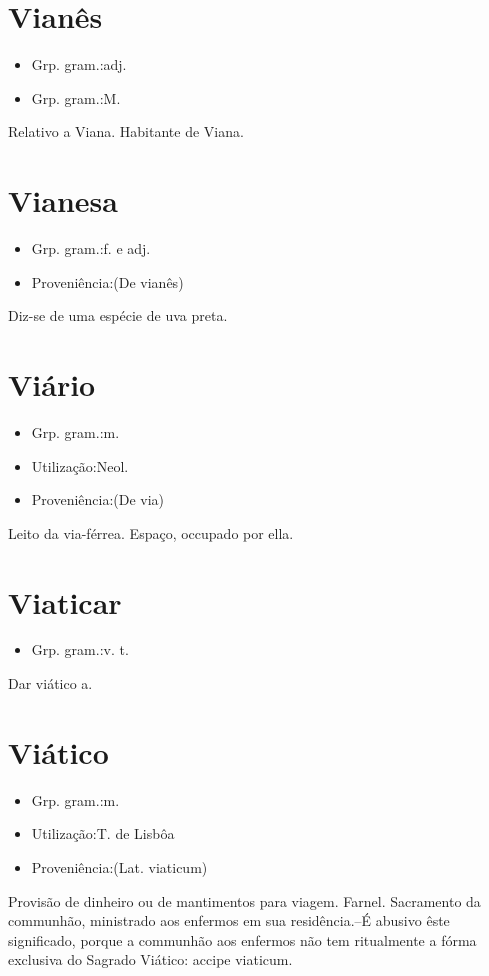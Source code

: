 \documentclass{article}
\begin{document}
\section{Vianês}
\begin{itemize}
\item {Grp. gram.:adj.}
\end{itemize}
\begin{itemize}
\item {Grp. gram.:M.}
\end{itemize}
Relativo a Viana.
Habitante de Viana.
\section{Vianesa}
\begin{itemize}
\item {Grp. gram.:f.  e  adj.}
\end{itemize}
\begin{itemize}
\item {Proveniência:(De \textunderscore vianês\textunderscore )}
\end{itemize}
Diz-se de uma espécie de uva preta.
\section{Viário}
\begin{itemize}
\item {Grp. gram.:m.}
\end{itemize}
\begin{itemize}
\item {Utilização:Neol.}
\end{itemize}
\begin{itemize}
\item {Proveniência:(De \textunderscore via\textunderscore )}
\end{itemize}
Leito da via-férrea.
Espaço, occupado por ella.
\section{Viaticar}
\begin{itemize}
\item {Grp. gram.:v. t.}
\end{itemize}
Dar viático a.
\section{Viático}
\begin{itemize}
\item {Grp. gram.:m.}
\end{itemize}
\begin{itemize}
\item {Utilização:T. de Lisbôa}
\end{itemize}
\begin{itemize}
\item {Proveniência:(Lat. \textunderscore viaticum\textunderscore )}
\end{itemize}
Provisão de dinheiro ou de mantimentos para viagem.
Farnel.
Sacramento da communhão, ministrado aos enfermos em sua residência.--É abusivo êste significado, porque a communhão aos enfermos não tem ritualmente a fórma exclusiva do Sagrado Viático: \textunderscore accipe viaticum\textunderscore .
\end{document}
